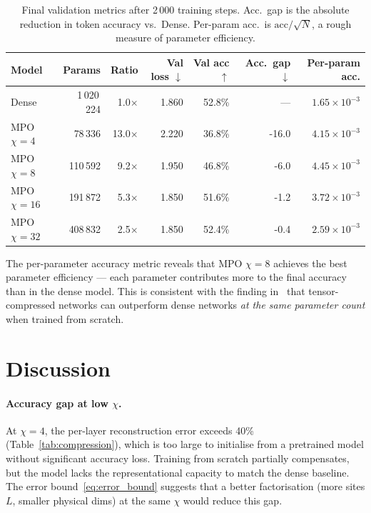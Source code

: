 \documentclass[11pt,a4paper]{article}
\theoremstyle{definition}
\begin{document}
\begin{table}[H]
\centering
\caption{Final validation metrics after 2\,000 training steps. Acc.\ gap is the absolute reduction in token accuracy vs.\ Dense. Per-param acc.\ is $\text{acc}/\sqrt{N}$, a rough measure of parameter efficiency.}
\label{tab:results}
\setlength{\tabcolsep}{8pt}
\begin{tabular}{l r r r r r r}
\toprule
Model & Params & Ratio & Val loss $\downarrow$ & Val acc $\uparrow$ & Acc.\ gap $\downarrow$ & Per-param acc. \\
\midrule
Dense           & 1\,020\,224 & 1.0$\times$ & 1.860 & 52.8\% & ---    & $1.65 \times 10^{-3}$ \\
MPO $\chi=4$   & 78\,336     & 13.0$\times$ & 2.220 & 36.8\% & -16.0  & $4.15 \times 10^{-3}$ \\
MPO $\chi=8$   & 110\,592    &  9.2$\times$ & 1.950 & 46.8\% & -6.0   & $4.45 \times 10^{-3}$ \\
MPO $\chi=16$  & 191\,872    &  5.3$\times$ & 1.850 & 51.6\% & -1.2   & $3.72 \times 10^{-3}$ \\
MPO $\chi=32$  & 408\,832    &  2.5$\times$ & 1.850 & 52.4\% & -0.4   & $2.59 \times 10^{-3}$ \\
\bottomrule
\end{tabular}
\end{table}

The per-parameter accuracy metric reveals that MPO $\chi=8$ achieves the best parameter efficiency — each parameter contributes more to the final accuracy than in the dense model. This is consistent with the finding in~\citet{novikov2015tensorizing} that tensor-compressed networks can outperform dense networks \emph{at the same parameter count} when trained from scratch.


\section{Discussion}

\paragraph{Accuracy gap at low $\chi$.}
At $\chi=4$, the per-layer reconstruction error exceeds 40\% (Table~\ref{tab:compression}), which is too large to initialise from a pretrained model without significant accuracy loss. Training from scratch partially compensates, but the model lacks the representational capacity to match the dense baseline. The error bound~\eqref{eq:error_bound} suggests that a better factorisation (more sites $L$, smaller physical dims) at the same $\chi$ would reduce this gap.
\end{document}
